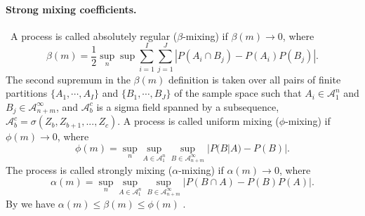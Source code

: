 \paragraph{Strong mixing coefficients.}\
A process is called absolutely regular ($\beta$-mixing) if $\beta(m) \rightarrow 0$, where 
\begin{equation*}
\beta(m) = \frac 1 2 \sup_n \sup \sum_{i=1}^{I} \sum_{j=1}^{J}  |P(A_i \cap B_j) - P(A_i)P(B_j) |.
\end{equation*}
The second supremum in the $\beta(m)$ definition is taken over all pairs of finite partitions $\{A_1,\cdots,A_I\}$  and $\{B_1,\cdots,B_J\}$ of the sample space such that $A_i \in \mathcal{A}_{1}^{n}$ and $B_j \in \mathcal{A}_{n+m}^{\infty}$, and $\mathcal{A}_{b}^{c}$ is a sigma field spanned by a subsequence, $\mathcal{A}_{b}^{c} = \sigma(Z_b,Z_{b+1}, ..., Z_{c})$. 
A process is called uniform mixing ($\phi$-mixing) if $\phi(m) \rightarrow 0$, where
\begin{equation*}
\phi(m) = \sup_n  \sup_{A \in \mathcal{A}_{1}^{n} } \sup_{B \in \mathcal{A}_{n+m}^{\infty}}  |P(B|A) - P(B)|.
\end{equation*}
The process is called strongly mixing ($\alpha$-mixing) if $\alpha(m) \rightarrow 0$, where
\begin{equation*}
\alpha(m) = \sup_n  \sup_{A \in \mathcal{A}_{1}^{n} } \sup_{B \in \mathcal{A}_{n+m}^{\infty}}  |P(B \cap A) - P(B)P(A)|.
\end{equation*}
By \cite{bradley_basic_2005} we have  $\alpha(m) \leq \beta(m) \leq \phi(m)$ . 

